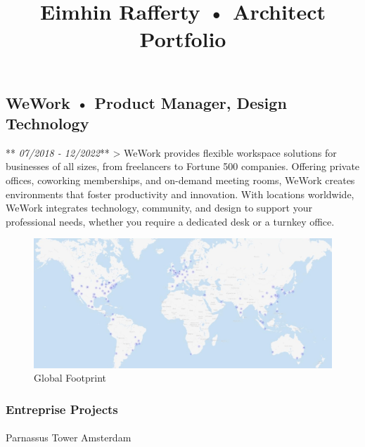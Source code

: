 \documentclass[
]{article}
\title{Eimhin Rafferty • Architect Portfolio}
\author{}
\date{}
\makeatletter
\let\oldparagraph\paragraph
\renewcommand{\paragraph}{
    \@ifstar
      \xxxParagraphStar
      \xxxParagraphNoStar
  }
\newcommand{\xxxParagraphStar}[1]{\oldparagraph*{#1}\mbox{}}
\newcommand{\xxxParagraphNoStar}[1]{\oldparagraph{#1}\mbox{}}
\makeatother
\begin{document}
\maketitle


\subsection{WeWork • Product Manager, Design
Technology}\label{wework-product-manager-design-technology}

** \emph{07/2018 - 12/2022}** \textgreater{} WeWork provides flexible
workspace solutions for businesses of all sizes, from freelancers to
Fortune 500 companies. Offering private offices, coworking memberships,
and on-demand meeting rooms, WeWork creates environments that foster
productivity and innovation. With locations worldwide, WeWork integrates
technology, community, and design to support your professional needs,
whether you require a dedicated desk or a turnkey office.

\begin{figure}[H]

{\centering \includegraphics{assets/WeWork/WeWorkMap.jpg}

}

\caption{Global Footprint}

\end{figure}%

\subsubsection{Entreprise Projects}\label{entreprise-projects}

\paragraph{Parnassus Tower Amsterdam}\label{parnassus-tower-amsterdam}
\end{document}
